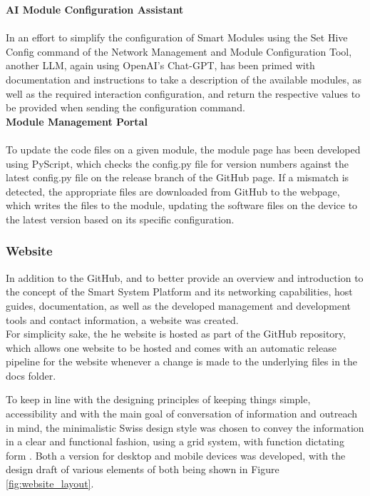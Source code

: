 \textbf{\label{sec:methods_codeai}AI Module Configuration Assistant}\\\\
In an effort to simplify the configuration of Smart Modules using the Set Hive Config command of the Network Management and Module Configuration Tool, another LLM, again using OpenAI's Chat-GPT, has been primed with documentation and instructions to take a description of the available modules, as well as the required interaction configuration, and return the respective values to be provided when sending the configuration command.\\

\textbf{\label{sec:methods_up}Module Management Portal}\\\\
To update the code files on a given module, the module page has been developed using PyScript, which checks the config.py file for version numbers against the latest config.py file on the release branch of the GitHub page. If a mismatch is detected, the appropriate files are downloaded from GitHub to the webpage, which writes the files to the module, updating the software files on the device to the latest version based on its specific configuration.\\

\subsubsection{\label{sec:methods_website}Website}
In addition to the GitHub, and to better provide an overview and introduction to the concept of the Smart System Platform and its networking capabilities, host guides, documentation, as well as the developed management and development tools and contact information, a website was created.\\

For simplicity sake, the he website is hosted as part of the GitHub repository, which allows one website to be hosted and comes with an automatic release pipeline for the website whenever a change is made to the underlying files in the docs folder.

To keep in line with the designing principles of keeping things simple, accessibility and with the main goal of conversation of information and outreach in mind, the minimalistic Swiss design style was chosen to convey the information in a clear and functional fashion, using a grid system, with function dictating form \citep{muller-brockmann_grid_2020, hollis_swiss_2006}. Both a version for desktop and mobile devices was developed, with the design draft of various elements of both being shown in Figure \ref{fig:website_layout}.

